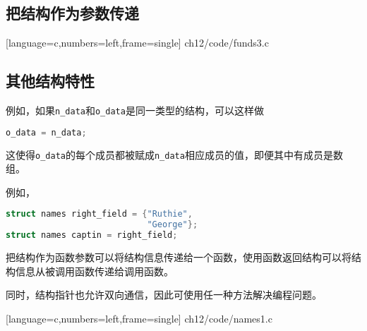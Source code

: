 \subsection{把结构作为参数传递}
\begin{frame}\ft{\subsecname}

[language=c,numbers=left,frame=single]  
{ch12/code/funds3.c}
\end{frame}


\subsection{其他结构特性}
\begin{frame}[fragile]\ft{\subsecname}
 \vspace{0.1in}

例如，如果\verb|n_data|和\verb|o_data|是同一类型的结构，可以这样做
\begin{lstlisting}[language=c,backgroundcolor=\color{red!20}]
o_data = n_data;
\end{lstlisting}
这使得\verb|o_data|的每个成员都被赋成\verb|n_data|相应成员的值，即便其中有成员是数组。
\end{frame}

\begin{frame}[fragile]\ft{\subsecname}
 \vspace{0.1in}

例如， 
\begin{lstlisting}[language=c,backgroundcolor=\color{red!20}]
struct names right_field = {"Ruthie", 
                            "George"};
struct names captin = right_field;
\end{lstlisting}
\end{frame}

\begin{frame}[fragile]\ft{\subsecname}
 \vspace{0.1in}

把结构作为函数参数可以将结构信息传递给一个函数，使用函数返回结构可以将结构信息从被调用函数传递给调用函数。\vspace{0.1in}

同时，结构指针也允许双向通信，因此可使用任一种方法解决编程问题。

\end{frame}

\begin{frame}\ft{\subsecname}

[language=c,numbers=left,frame=single]  
{ch12/code/names1.c}
\end{frame}


